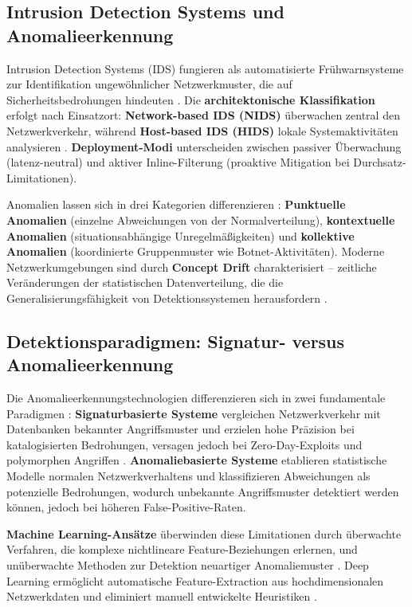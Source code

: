 \documentclass[11pt,a4paper]{article}
\begin{document}
    \subsection{Intrusion Detection Systems und Anomalieerkennung}

    Intrusion Detection Systems (IDS) fungieren als automatisierte Frühwarnsysteme zur Identifikation ungewöhnlicher Netzwerkmuster, die auf Sicherheitsbedrohungen hindeuten \parencite{Ring2019,Vinayakumar2019}. Die \textbf{architektonische Klassifikation} erfolgt nach Einsatzort: \textbf{Network-based IDS (NIDS)} überwachen zentral den Netzwerkverkehr, während \textbf{Host-based IDS (HIDS)} lokale Systemaktivitäten analysieren \parencite{Gharib2016}. \textbf{Deployment-Modi} unterscheiden zwischen passiver Überwachung (latenz-neutral) und aktiver Inline-Filterung (proaktive Mitigation bei Durchsatz-Limitationen).

    Anomalien lassen sich in drei Kategorien differenzieren \parencite{Ring2019}: \textbf{Punktuelle Anomalien} (einzelne Abweichungen von der Normalverteilung), \textbf{kontextuelle Anomalien} (situationsabhängige Unregelmäßigkeiten) und \textbf{kollektive Anomalien} (koordinierte Gruppenmuster wie Botnet-Aktivitäten). Moderne Netzwerkumgebungen sind durch \textbf{Concept Drift} charakterisiert – zeitliche Veränderungen der statistischen Datenverteilung, die die Generalisierungsfähigkeit von Detektionssystemen herausfordern \parencite{Gharib2016}.


    \subsection{Detektionsparadigmen: Signatur- versus Anomalieerkennung}

    Die Anomalieerkennungstechnologien differenzieren sich in zwei fundamentale Paradigmen \parencite{Ring2019,Belavagi2016}: \textbf{Signaturbasierte Systeme} vergleichen Netzwerkverkehr mit Datenbanken bekannter Angriffsmuster und erzielen hohe Präzision bei katalogisierten Bedrohungen, versagen jedoch bei Zero-Day-Exploits und polymorphen Angriffen \parencite{Vinayakumar2019}. \textbf{Anomaliebasierte Systeme} etablieren statistische Modelle normalen Netzwerkverhaltens und klassifizieren Abweichungen als potenzielle Bedrohungen, wodurch unbekannte Angriffsmuster detektiert werden können, jedoch bei höheren False-Positive-Raten.

    \textbf{Machine Learning-Ansätze} überwinden diese Limitationen durch überwachte Verfahren, die komplexe nichtlineare Feature-Beziehungen erlernen, und unüberwachte Methoden zur Detektion neuartiger Anomaliemuster \parencite{Vinayakumar2019}. Deep Learning ermöglicht automatische Feature-Extraction aus hochdimensionalen Netzwerkdaten und eliminiert manuell entwickelte Heuristiken \parencite{Goodfellow2016}.
\end{document}

